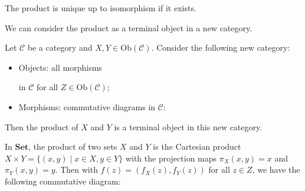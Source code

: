 \documentclass[
	11pt, %
	fleqn, %
	a4paper, %
]{LegrandOrangeBook}
\newcommand{\C}{\mathcal{C}} %
\newcommand{\Set}{\textbf{Set}} %
\newcommand{\Ob}[1]{\text{Ob}(#1)} %
\begin{document}
\begin{remark}
    The product is unique up to isomorphism if it exists.
\end{remark}

We can consider the product as a terminal object in a new category. 

\begin{corollary}
    Let $\C$ be a category and $X, Y \in \Ob{\C}$. Consider the following new category:
    \begin{itemize}
        \item Objects: all morphisms  in $\C$ for all $Z \in \Ob{\C}$;
        \item Morphisms: commutative diagrams in $\C$:
    \end{itemize}
    \begin{center}
    \end{center}
    Then the product of $X$ and $Y$ is a terminal object in this new category.
\end{corollary}

\begin{example}
    In $\Set$, the product of two sets $X$ and $Y$ is the Cartesian product $X \times Y = \{ (x, y) \mid x \in X, y \in Y \}$ with the projection maps $\pi_X(x, y) = x$ and $\pi_Y(x, y) = y$. Then with $f(z) = (f_X(z), f_Y(z))$ for all $z \in Z$, we have the following commutative diagram:
    \begin{center}
    \end{center}
    
\end{example}
\end{document}
